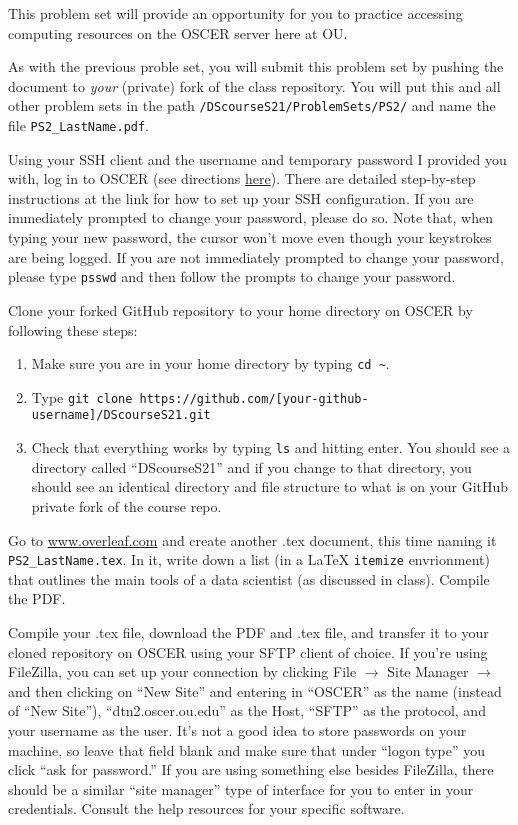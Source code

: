 \documentclass[12pt,english]{exam}
\begin{document}
This problem set will provide an opportunity for you to practice accessing computing resources on the OSCER server here at OU.

As with the previous proble set, you will submit this problem set by pushing the document to \emph{your} (private) fork of the class repository. You will put this and all other problem sets in the path \texttt{/DScourseS21/ProblemSets/PS2/} and name the file \texttt{PS2\_LastName.pdf}.
\begin{questions}
\question Using your SSH client and the username and temporary password I provided you with, log in to OSCER (see directions \href{www.ou.edu/content/oscer/getting_started/getting_started_using_oscer.html}{here}). There are detailed step-by-step instructions at the link for how to set up your SSH configuration. If you are immediately prompted to change your password, please do so. Note that, when typing your new password, the cursor won't move even though your keystrokes are being logged. If you are not immediately prompted to change your password, please type \texttt{psswd} and then follow the prompts to change your password.

\question Clone your forked GitHub repository to your home directory on OSCER by following these steps:
\begin{enumerate}
	\item Make sure you are in your home directory by typing \texttt{cd \~}.
	\item Type \texttt{git clone https://github.com/[your-github-username]/DScourseS21.git}
	\item Check that everything works by typing \texttt{ls} and hitting enter. You should see a directory called ``DScourseS21'' and if you change to that directory, you should see an identical directory and file structure to what is on your GitHub private fork of the course repo.
\end{enumerate}

\question Go to \url{www.overleaf.com} and create another .tex document, this time naming it \texttt{PS2\_LastName.tex}. In it, write down a list (in a LaTeX \texttt{itemize} envrionment) that outlines the main tools of a data scientist (as discussed in class). Compile the PDF.

\question Compile your .tex file, download the PDF and .tex file, and transfer it to your cloned repository on OSCER using your SFTP client of choice. If you're using FileZilla, you can set up your connection by clicking File $\rightarrow$ Site Manager $\rightarrow$ and then clicking on ``New Site'' and entering in ``OSCER'' as the name (instead of ``New Site''), ``dtn2.oscer.ou.edu'' as the Host, ``SFTP'' as the protocol, and your username as the user. It's not a good idea to store passwords on your machine, so leave that field blank and make sure that under ``logon type'' you click ``ask for password.'' If you are using something else besides FileZilla, there should be a similar ``site manager'' type of interface for you to enter in your credentials. Consult the help resources for your specific software.


\end{questions}
\end{document}
